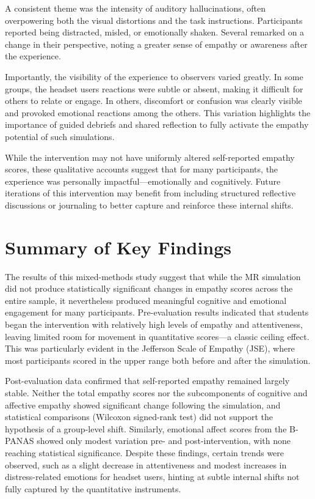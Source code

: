 A consistent theme was the intensity of auditory hallucinations, often overpowering both the visual distortions and the task instructions. Participants reported being distracted, misled, or emotionally shaken. Several remarked on a change in their perspective, noting a greater sense of empathy or awareness after the experience.

Importantly, the visibility of the experience to observers varied greatly. In some groups, the headset users reactions were subtle or absent, making it difficult for others to relate or engage. In others, discomfort or confusion was clearly visible and provoked emotional reactions among the others. This variation highlights the importance of guided debriefs and shared reflection to fully activate the empathy potential of such simulations.

While the intervention may not have uniformly altered self-reported empathy scores, these qualitative accounts suggest that for many participants, the experience was personally impactful—emotionally and cognitively. Future iterations of this intervention may benefit from including structured reflective discussions or journaling to better capture and reinforce these internal shifts.


\section{Summary of Key Findings}

The results of this mixed-methods study suggest that while the MR simulation did not produce statistically significant changes in empathy scores across the entire sample, it nevertheless produced meaningful cognitive and emotional engagement for many participants. Pre-evaluation results indicated that students began the intervention with relatively high levels of empathy and attentiveness, leaving limited room for  movement in quantitative scores—a classic ceiling effect. This was particularly evident in the Jefferson Scale of Empathy (JSE), where most participants scored in the upper range both before and after the simulation.

Post-evaluation data confirmed that self-reported empathy remained largely stable. Neither the total empathy scores nor the subcomponents of cognitive and affective empathy showed significant change following the simulation, and statistical comparisons (Wilcoxon signed-rank test) did not support the hypothesis of a group-level shift. Similarly, emotional affect scores from the B-PANAS showed only modest variation pre- and post-intervention, with none reaching statistical significance. Despite these findings, certain trends were observed, such as a slight decrease in attentiveness and modest increases in distress-related emotions for headset users, hinting at subtle internal shifts not fully captured by the quantitative instruments.

